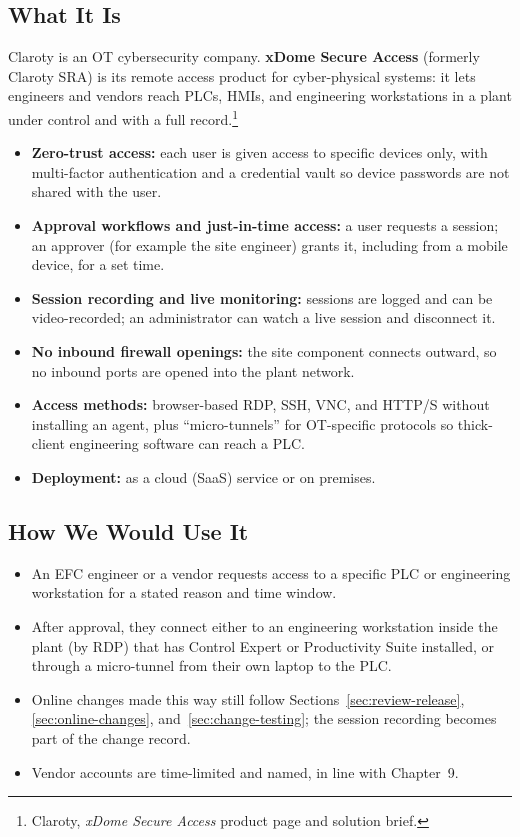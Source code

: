 \subsection{What It Is}
Claroty is an OT cybersecurity company. \textbf{xDome Secure Access} (formerly Claroty SRA) is its remote access product for cyber-physical systems: it lets engineers and vendors reach PLCs, HMIs, and engineering workstations in a plant under control and with a full record.\footnote{Claroty, \emph{xDome Secure Access} product page and solution brief.}
\begin{itemize}[itemsep=1pt]
  \item \textbf{Zero-trust access:} each user is given access to specific devices only, with multi-factor authentication and a credential vault so device passwords are not shared with the user.
  \item \textbf{Approval workflows and just-in-time access:} a user requests a session; an approver (for example the site engineer) grants it, including from a mobile device, for a set time.
  \item \textbf{Session recording and live monitoring:} sessions are logged and can be video-recorded; an administrator can watch a live session and disconnect it.
  \item \textbf{No inbound firewall openings:} the site component connects outward, so no inbound ports are opened into the plant network.
  \item \textbf{Access methods:} browser-based RDP, SSH, VNC, and HTTP/S without installing an agent, plus ``micro-tunnels'' for OT-specific protocols so thick-client engineering software can reach a PLC.
  \item \textbf{Deployment:} as a cloud (SaaS) service or on premises.
\end{itemize}

\subsection{How We Would Use It}
\begin{itemize}[itemsep=1pt]
  \item An EFC engineer or a vendor requests access to a specific PLC or engineering workstation for a stated reason and time window.
  \item After approval, they connect either to an engineering workstation inside the plant (by RDP) that has Control Expert or Productivity Suite installed, or through a micro-tunnel from their own laptop to the PLC.
  \item Online changes made this way still follow Sections~\ref{sec:review-release}, \ref{sec:online-changes}, and~\ref{sec:change-testing}; the session recording becomes part of the change record.
  \item Vendor accounts are time-limited and named, in line with Chapter~9.
\end{itemize}

